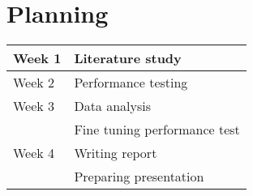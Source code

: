 \documentclass[Planning]{subfiles}
\begin{document}
\section{Planning}
\begin{tabular}{| l |  l |}
\hline
Week 1 & Literature study \\ \hline
Week 2 & Performance testing \\ \hline
Week 3 & Data analysis \\ \hline
 & Fine tuning performance test \\ \hline
Week 4 & Writing report \\ \hline
 & Preparing presentation \\ \hline
\end{tabular}
\end{document}
